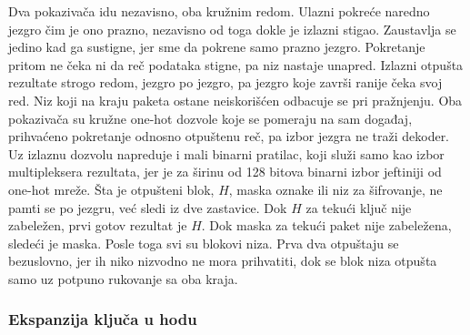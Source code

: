 Dva pokazivača idu nezavisno, oba kružnim redom. Ulazni pokreće naredno jezgro čim je ono prazno, nezavisno od toga dokle je izlazni stigao. Zaustavlja se jedino kad ga sustigne, jer sme da pokrene samo prazno jezgro. Pokretanje pritom ne čeka ni da reč podataka stigne, pa niz nastaje unapred. Izlazni otpušta rezultate strogo redom, jezgro po jezgro, pa jezgro koje završi ranije čeka svoj red. Niz koji na kraju paketa ostane neiskorišćen odbacuje se pri pražnjenju. Oba pokazivača su kružne one-hot dozvole koje se pomeraju na sam događaj, prihvaćeno pokretanje odnosno otpuštenu reč, pa izbor jezgra ne traži dekoder. Uz izlaznu dozvolu napreduje i mali binarni pratilac, koji služi samo kao izbor multipleksera rezultata, jer je za širinu od 128 bitova binarni izbor jeftiniji od one-hot mreže.
\smallbreak
Šta je otpušteni blok, $H$, maska oznake ili niz za šifrovanje, ne pamti se po jezgru, već sledi iz dve zastavice. Dok $H$ za tekući ključ nije zabeležen, prvi gotov rezultat je $H$. Dok maska za tekući paket nije zabeležena, sledeći je maska. Posle toga svi su blokovi niza. Prva dva otpuštaju se bezuslovno, jer ih niko nizvodno ne mora prihvatiti, dok se blok niza otpušta samo uz potpuno rukovanje sa oba kraja.

\subsubsection{Ekspanzija ključa u hodu}
\label{subsec:hw_aes_kljuc}

